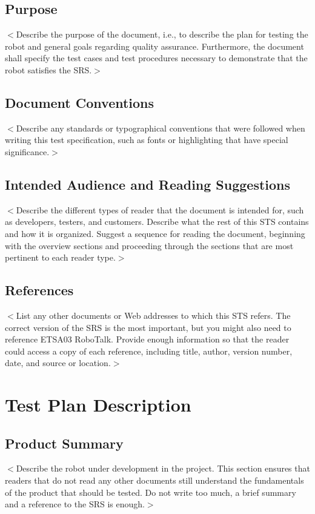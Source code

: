 \documentclass{scrreprt}
\begin{document}
\section{Purpose}
$<$Describe the purpose of the document, i.e., to describe the plan for testing the robot and general goals regarding quality assurance. Furthermore, the document shall specify the test cases and test procedures necessary to demonstrate that the robot satisfies the SRS.$>$

\section{Document Conventions}
$<$Describe any standards or typographical conventions that were followed when writing this test specification, such as fonts or highlighting that have special significance.$>$

\section{Intended Audience and Reading Suggestions}
$<$Describe the different types of reader that the document is intended for, such as developers, testers, and customers. Describe what the rest of this STS contains and how it is organized. Suggest a sequence for reading the document, beginning with the overview sections and proceeding through the sections that are most pertinent to each reader type.$>$

\section{References}
$<$List any other documents or Web addresses to which this STS refers. The correct version of the SRS is the most important, but you might also need to reference ETSA03 RoboTalk. Provide enough information so that the reader could access a copy of each reference, including title, author, version number, date, and source or location.$>$

\chapter{Test Plan Description}

\section{Product Summary}
$<$Describe the robot under development in the project. This section ensures that readers that do not read any other documents still understand the fundamentals of the product that should be tested. Do not write too much, a brief summary and a reference to the SRS is enough.$>$
\end{document}

